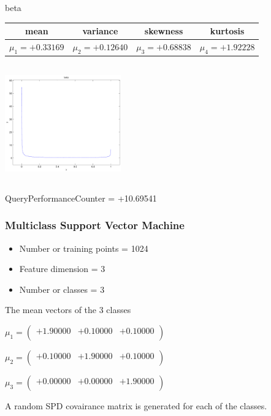\documentclass[9pt]{article}
\theoremstyle{plain}
\theoremstyle{definition}
\theoremstyle{remark}
\numberwithin{equation}{section}
\begin{document}
\newpage
beta \begin{tabular}{|c|c|c|c|}  mean & variance & skewness & kurtosis \\  \hline
$\mu_1 = +0.33169$ & $\mu_2 = +0.12640$ & $\mu_3 = +0.68838$ & $\mu_4 =+1.92228$ \\
\end{tabular}

\includegraphics[width=5cm,height=5cm]{beta.pdf}

QueryPerformanceCounter  =  +10.69541
\subsubsection{Multiclass Support Vector Machine }
\begin{itemize}
\item Number or training points = 1024
\item Feature dimension = 3
\item Number or classes = 3
\end{itemize}
{The mean vectors of the 3 classes}

$\mu_1 = \left(
\begin{array}{
ccc}
+1.90000 & +0.10000 & +0.10000 \\
\end{array}
\right)$ \newline 

$\mu_2 = \left(
\begin{array}{
ccc}
+0.10000 & +1.90000 & +0.10000 \\
\end{array}
\right)$ \newline 

$\mu_3 = \left(
\begin{array}{
ccc}
+0.00000 & +0.00000 & +1.90000 \\
\end{array}
\right)$ \newline 

A random SPD covairance matrix is generated for each of the classes.\newline
\end{document}
